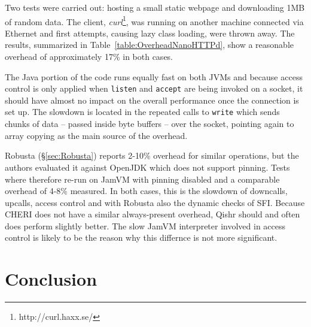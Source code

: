 \documentclass[a4paper,12pt,twoside,openright]{report}
\begin{document}
Two tests were carried out: hosting a small static webpage and downloading 1MB of random data. The client, \emph{curl}\footnote{http://curl.haxx.se/}, was running on another machine connected via Ethernet and first attempts, causing lazy class loading, were thrown away. The results, summarized in Table~\ref{table:OverheadNanoHTTPd}, show a reasonable overhead of approximately 17\% in both cases.

The Java portion of the code runs equally fast on both JVMs and because access control is only applied when \texttt{listen} and \texttt{accept} are being invoked on a socket, it should have almost no impact on the overall performance once the connection is set up. The slowdown is located in the repeated calls to \texttt{write} which sends chunks of data -- passed inside byte buffers -- over the socket, pointing again to array copying as the main source of the overhead.

Robusta (\S\ref{sec:Robusta}) reports 2-10\% overhead for similar operations, but the authors evaluated it against OpenJDK which does not support pinning. Tests where therefore re-run on JamVM with pinning disabled and a comparable overhead of 4-8\% measured. In both cases, this is the slowdown of downcalls, upcalls, access control and with Robusta also the dynamic checks of SFI. Because CHERI does not have a similar always-present overhead, Qishr should and often does perform slightly better. The slow JamVM interpreter involved in access control is likely to be the reason why this differnce is not more significant.

\chapter{Conclusion} 

\appendix
\singlespacing

 
 
\end{document}
